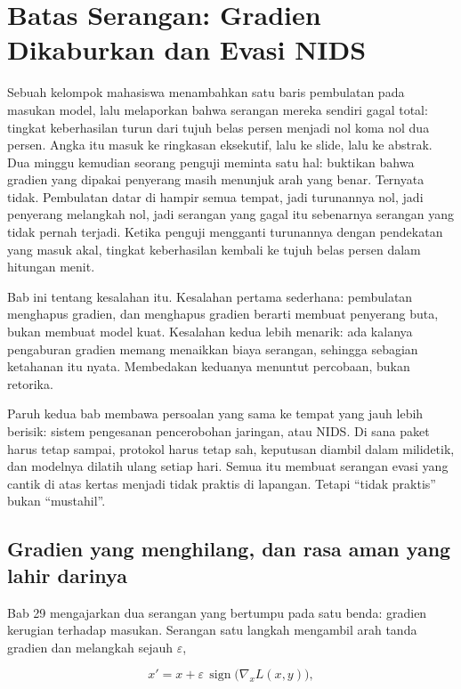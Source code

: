 \chapter{Batas Serangan: Gradien Dikaburkan dan Evasi NIDS}

Sebuah kelompok mahasiswa menambahkan satu baris pembulatan pada masukan model, lalu
melaporkan bahwa serangan mereka sendiri gagal total: tingkat keberhasilan turun dari
tujuh belas persen menjadi nol koma nol dua persen. Angka itu masuk ke ringkasan
eksekutif, lalu ke slide, lalu ke abstrak. Dua minggu kemudian seorang penguji meminta
satu hal: buktikan bahwa gradien yang dipakai penyerang masih menunjuk arah yang benar.
Ternyata tidak. Pembulatan datar di hampir semua tempat, jadi turunannya nol, jadi
penyerang melangkah nol, jadi serangan yang gagal itu sebenarnya serangan yang tidak
pernah terjadi. Ketika penguji mengganti turunannya dengan pendekatan yang masuk akal,
tingkat keberhasilan kembali ke tujuh belas persen dalam hitungan menit.

Bab ini tentang kesalahan itu. Kesalahan pertama sederhana: pembulatan menghapus gradien,
dan menghapus gradien berarti membuat penyerang buta, bukan membuat model kuat. Kesalahan
kedua lebih menarik: ada kalanya pengaburan gradien memang menaikkan biaya serangan,
sehingga sebagian ketahanan itu nyata. Membedakan keduanya menuntut percobaan, bukan
retorika.

Paruh kedua bab membawa persoalan yang sama ke tempat yang jauh lebih berisik: sistem
pengesanan pencerobohan jaringan, atau NIDS. Di sana paket harus tetap sampai, protokol
harus tetap sah, keputusan diambil dalam milidetik, dan modelnya dilatih ulang setiap
hari. Semua itu membuat serangan evasi yang cantik di atas kertas menjadi tidak praktis
di lapangan. Tetapi ``tidak praktis'' bukan ``mustahil''.

\section{Gradien yang menghilang, dan rasa aman yang lahir darinya}

Bab 29 mengajarkan dua serangan yang bertumpu pada satu benda: gradien kerugian
terhadap masukan. Serangan satu langkah mengambil arah tanda gradien dan melangkah
sejauh $\varepsilon$,

\begin{equation}
x' = x + \varepsilon\,\operatorname{sign}\bigl(\nabla_x L(x,y)\bigr),
\end{equation}

